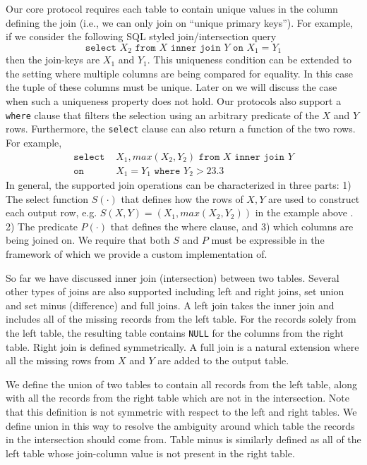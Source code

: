 \fi
Our core protocol requires each table to contain unique values in the column defining the join  (i.e., we can only join on ``unique primary keys''). For example, if we consider the following SQL styled join/intersection query
$$
\texttt{select } X_2 \texttt{ from } X \texttt{ inner join } Y \texttt{ on } X_1 = Y_1
$$
then the join-keys are $X_1$ and $Y_1$. This uniqueness condition can be extended to the setting where multiple columns are being compared for equality. 
\iffullversion
In this case the tuple of these columns must be unique. 
\fi
Later on we will discuss the case when such a uniqueness property does not hold. Our protocols also support a \texttt{where} clause that filters the selection using an arbitrary predicate of the $X$ and $Y$ rows. Furthermore, the \texttt{select} clause can also return a function of the two rows. For example,
\begin{align*}
\texttt{select }&  X_1,max(X_2, Y_2)  \texttt{ from } X \texttt{ inner join } Y \\
\texttt{on }& X_1 = Y_1 \texttt{ where } Y_2 > 23.3
\end{align*}
In general, the supported join operations can be characterized in three parts: 1) The select function $S(\cdot)$ that defines how the rows of $X,Y$ are used to construct each output row, e.g. $S(X,Y)=(X_1, max(X_2,Y_2))$
\iffullversion
in the example above
\fi. 2) The predicate $P(\cdot)$ that defines the where clause, and 3) which columns are being joined on.
\iffullversion
 We require that both $S$ and $P$ must be expressible in the framework of \cite{aby3} which we provide a custom implementation of.
\fi

\iffullversion
So far we have discussed inner join (intersection) between two tables. 
\fi
Several other types of joins are also supported including left and right joins, set union and set minus (difference) and full joins. A left join takes the inner join and includes all of the missing records from the left table. For the records solely from the left table, the resulting table contains \texttt{NULL} for the columns from the right table. Right join is defined symmetrically. A full join is a natural extension where all the missing rows from $X$ and $Y$ are added to the output table.

We define the union of two tables to contain all records from the left table, along with all the records from the right table which are not in the intersection. Note that this definition is not symmetric with respect to the left and right tables. We define union in this way to resolve the ambiguity around which table the records in the intersection should come from. Table minus is similarly defined as all of the left table whose join-column value is not present in the right table. 

